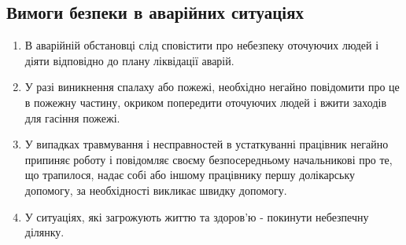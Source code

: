 \subsection{Вимоги безпеки в аварійних ситуаціях}
\begin{enumerate}
  \item В аварійній обстановці слід сповістити про небезпеку оточуючих людей
    і діяти відповідно до плану ліквідації аварій.
  \item У разі виникнення спалаху або пожежі, необхідно негайно повідомити
    про це в пожежну частину, окриком попередити оточуючих людей і вжити
    заходів для гасіння пожежі.
  \item У випадках травмування і несправностей в устаткуванні працівник негайно
    припиняє роботу і повідомляє своєму безпосередньому начальникові про те,
    що трапилося, надає собі або іншому працівнику першу долікарську допомогу,
    за необхідності викликає швидку допомогу.
  \item У ситуаціях, які загрожують життю та здоров'ю - покинути небезпечну ділянку.
\end{enumerate}